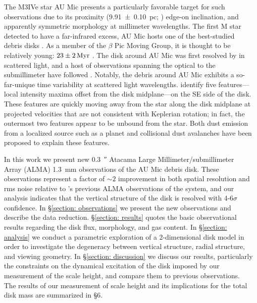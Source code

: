 \documentclass[modern]{aastex62}
\begin{document}
The M3IVe star AU Mic presents a particularly favorable target for such observations due to its proximity (\SI{9.91 \pm 0.10}{pc}; \citealp{vanleeuwen07}) edge-on inclination, and apparently symmetric morphology at millimeter wavelengths.
The first M star detected to have a far-infrared excess, AU Mic hosts one of the best-studied debris disks \citep{moshir90}. 
As a member of the $\beta$ Pic Moving Group, it is thought to be relatively young: $\SI{23 \pm 2}{Myr}$ \citep{binks&jeffries14,mamajek&bell14,malo14}. 
The disk around AU Mic was first resolved by \cite{kalas04} in scattered light, and a host of observations spanning the optical to the submillimeter have followed \citep{augereau&beust06,macgregor13,matthews15,schneider14,wang15}. 
Notably, the debris around AU Mic exhibits a so-far-unique time variability at scattered light wavelengths.
\cite{boccaletti15} identify five features---local intensity maxima offset from the disk midplane---on the SE side of the disk. 
These features are quickly moving away from the star along the disk midplane at projected velocities that are not consistent with Keplerian rotation; in fact, the outermost two features appear to be unbound from the star. 
Both dust emission from a localized source such as a planet \citep{boccaletti15,sezestre17} and collisional dust avalanches \citep{chiang&fung17} have been proposed to explain these features.

In this work we present new \SI{0.3}{\arcsecond} Atacama Large Millimeter/submillimeter Array \newline (ALMA) \SI{1.3}{mm} observations of the AU Mic debris disk. 
These observations represent a factor of $\sim 2$ improvement in both spatial resolution and rms noise relative to \cite{macgregor13}'s previous ALMA observations of the system, and our analysis indicates that the vertical structure of the disk is resolved with 4-6$\sigma$ confidence.
In \S \ref{section: observations} we present the new observations and describe the data reduction.  
\S \ref{section: results} quotes the basic observational results regarding the disk flux, morphology, and gas content.  
In \S \ref{section: analysis} we conduct a parametric exploration of a 2-dimensional disk model in order to investigate the degeneracy between vertical structure, radial structure, and viewing geometry.
In \S \ref{section: discussion} we discuss our results, particularly the constraints on the dynamical excitation of the disk imposed by our measurement of the scale height, and compare them to previous observations.
The results of our measurement of scale height and its implications for the total disk mass are summarized in \S 6.
\end{document}
